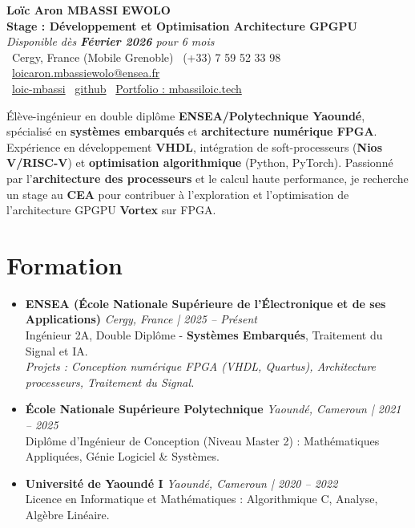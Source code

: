 \documentclass[a4paper,11pt]{article}
\begin{document}
\begin{center}
    {\Large \textbf{Loïc Aron MBASSI EWOLO}} \\ \vspace{4pt}
    \textbf{\large Stage : Développement et Optimisation Architecture GPGPU} \\
    \textit{\small Disponible dès \textbf{Février 2026} pour 6 mois}\\
    \vspace{4pt}
    \small
    \faMapMarker\ Cergy, France (Mobile Grenoble) \quad
    \faPhone\ (+33) 7 59 52 33 98 \quad
    \faEnvelope\ \href{mailto:loicaron.mbassiewolo@ensea.fr}{loicaron.mbassiewolo@ensea.fr} \\ \vspace{2pt}
    \faLinkedin\ \href{https://www.linkedin.com/in/loic-mbassi}{loic-mbassi} \quad
    \faGithub\ \href{https://github.com/Nameless0l}{github} \quad
    \faGlobe\ \href{https://mbassiloic.tech/\#portfolio}{Portfolio : mbassiloic.tech}
\end{center}

\vspace{-6pt}

\noindent\small{Élève-ingénieur en double diplôme \textbf{ENSEA/Polytechnique Yaoundé}, spécialisé en \textbf{systèmes embarqués} et \textbf{architecture numérique FPGA}. Expérience en développement \textbf{VHDL}, intégration de soft-processeurs (\textbf{Nios V/RISC-V}) et \textbf{optimisation algorithmique} (Python, PyTorch). Passionné par l'\textbf{architecture des processeurs} et le calcul haute performance, je recherche un stage au \textbf{CEA} pour contribuer à l'exploration et l'optimisation de l'architecture GPGPU \textbf{Vortex} sur FPGA.}

\section{Formation}
\begin{itemize}[leftmargin=*, label={.}, nosep]
    \item \textbf{ENSEA (École Nationale Supérieure de l'Électronique et de ses Applications)} \hfill \textit{Cergy, France | 2025 -- Présent} \\
    \small{Ingénieur 2A, Double Diplôme - \textbf{Systèmes Embarqués}, Traitement du Signal et IA.} \\
    \textit{\small{Projets : Conception numérique FPGA (VHDL, Quartus), Architecture processeurs, Traitement du Signal.}}
    \vspace{2pt}
    \item \textbf{École Nationale Supérieure Polytechnique} \hfill \textit{Yaoundé, Cameroun | 2021 -- 2025} \\
    \small{Diplôme d'Ingénieur de Conception (Niveau Master 2) : Mathématiques Appliquées, Génie Logiciel \& Systèmes.}
    \item \textbf{Université de Yaoundé I} \hfill \textit{Yaoundé, Cameroun | 2020 -- 2022} \\
    \small{Licence en Informatique et Mathématiques : Algorithmique C, Analyse, Algèbre Linéaire.}
\end{itemize}
\end{document}
